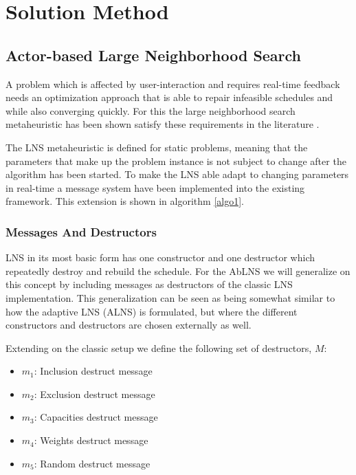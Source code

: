 \documentclass[preprint,12pt,authoryear]{elsarticle}
\begin{document}
\section{Solution Method}
\label{sec:2-solution-method}

\subsection{Actor-based Large Neighborhood Search}
A problem which is affected by user-interaction and requires real-time feedback needs an optimization approach that is able to repair infeasible schedules and while also 
converging quickly. For this the large neighborhood search metaheuristic has been shown satisfy these requirements in the literature \cite{gendreauHandbookMetaheuristics2019}. 

The LNS metaheuristic is defined for static problems, meaning that the parameters that make up the problem instance is not subject to change 
after the algorithm has been started. To make the LNS able adapt to changing parameters in real-time a message system have been implemented into the existing framework. This 
extension is shown in algorithm \ref{algo1}.  

\subsubsection{Messages And Destructors}
LNS in its most basic form has one constructor and one destructor which repeatedly destroy and rebuild the schedule. For the AbLNS we will generalize on this concept by 
including messages as destructors of the classic LNS implementation. This generalization can be seen as being somewhat similar to how the adaptive LNS (ALNS) is formulated,
but where the different constructors and destructors are chosen externally as well. 

Extending on the classic setup we define the following set of destructors, $M$:

\begin{itemize}
	\item $m_1$: Inclusion destruct message	
	\item $m_2$: Exclusion destruct message	
	\item $m_3$: Capacities destruct message	
	\item $m_4$: Weights destruct message	
	\item $m_5$: Random destruct message
\end{itemize}
\end{document}
